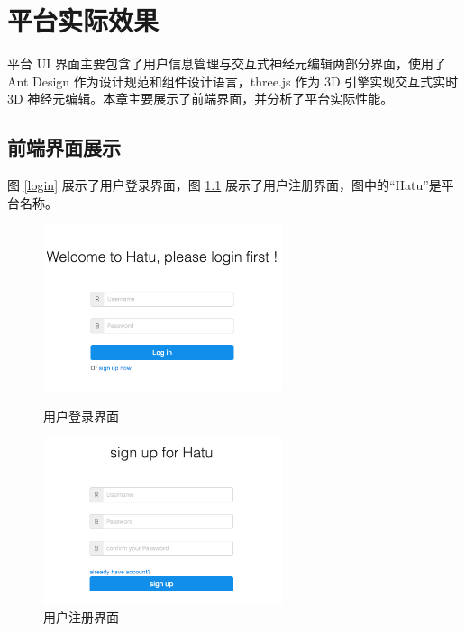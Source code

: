 \chapter{平台实际效果}
平台 UI 界面主要包含了用户信息管理与交互式神经元编辑两部分界面，使用了 Ant Design 作为设计规范和组件设计语言，three.js 作为 3D 引擎实现交互式实时 3D 神经元编辑。本章主要展示了前端界面，并分析了平台实际性能。

\section{前端界面展示}
图 \ref{login} 展示了用户登录界面，图 \ref{register} 展示了用户注册界面，图中的“Hatu”是平台名称。

\begin{figure}[!ht]
\begin{minipage}[t]{0.5\linewidth} 
    \centering  
    \includegraphics[width=7cm]{images/login}  
    \caption{用户登录界面}
    \label{login}  
    \end{minipage}  
    \begin{minipage}[t]{0.5\linewidth}
    \centering  
    \includegraphics[width=7cm]{images/register}  
    \caption{用户注册界面}  
    \label{register}  
    \end{minipage}  
\end{figure}

